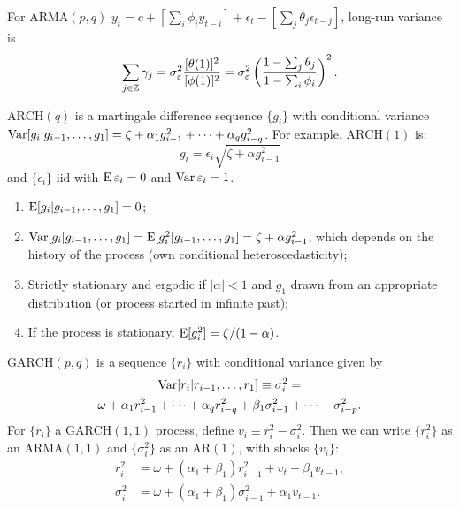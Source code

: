 \documentclass[8pt,letterpaper, landscape]{extarticle} %
\begin{document}
\begin{multicols}{3}
\begin{description}
For $ \text{ARMA} (p,q) $ $ y_t = c + [ \sum_i \phi_i y_{t-i} ] + \epsilon_t - [ \sum_j \theta_j \epsilon_{t-j}] $, long-run variance is
\[ \sum_{j \in \mathbb{Z}} \gamma_{j} = \sigma_{\varepsilon}^{2} \frac{[\theta(1)]^2}{[\phi(1)]^2} = \sigma_{\varepsilon}^{2} \left( \frac{1 - \sum_j \theta_j}{1 - \sum_i \phi_i} \right)^{2}. \]

 $ \text{ARCH} (q) $ is a martingale difference sequence $ \{ g_i \} $ with conditional variance $ \operatorname{Var} [g_i | g_{i-1}, \dotsc , g_{1}] = \zeta + \alpha_1 g_{i-1}^{2} + \dotsb + \alpha_q g_{i-q}^{2} $. For example, $ \text{ARCH} (1) $ is:
\[ g_i = \epsilon_i \sqrt{\zeta + \alpha g_{i-1}^{2}} \]
and $ \{ \epsilon_i \} $ iid with $ \operatorname{E} \varepsilon_i = 0 $ and $ \operatorname{Var} \varepsilon_i = 1 $.
\begin{enumerate}
\item $ \operatorname{E} [g_i | g_{i-1} , \dotsc , g_{1} ] = 0 $;
\item $ \operatorname{Var} [g_i | g_{i-1}, \dotsc , g_{1}] = \operatorname{E} [g_i^2 | g_{i-1} , \dotsc , g_{1}] = \zeta + \alpha g_{i-1}^{2} $, which depends on the history of the process (own conditional heteroscedasticity);
\item Strictly stationary and ergodic if $ | \alpha | < 1 $ and $ g_1 $ drawn from an appropriate distribution (or process started in infinite past);
\item If the process is stationary, $ \operatorname{E} [g_i^2] = \zeta / ( 1 - \alpha ) $.
\end{enumerate}

$ \text{GARCH} (p, q) $ is a sequence $ \{ r_i \} $ with conditional variance given by
\begin{multline*}
\operatorname{Var} [r_i | r_{i-1}, \dotsc , r_{1}] \equiv \sigma^{2}_{i} = \\
\omega + \alpha_1 r_{i-1}^{2} + \dotsb + \alpha_q r_{i-q}^{2} + \beta_1 \sigma^{2}_{i-1} + \dotsb + \sigma^{2}_{i-p} .
\end{multline*}
For $ \{ r_i \} $ a $ \text{GARCH} (1,1) $ process, define $ v_i \equiv r_{i}^{2} - \sigma_{i}^{2} $. Then we can write $ \{ r_{i}^{2} \} $ as an $ \text{ARMA} (1,1) $ and $ \{ \sigma_{i}^{2} \} $ as an $ \text{AR} (1) $, with shocks $ \{ v_{i} \} $:
\begin{align*}
r_{i}^{2} &= \omega + (\alpha_1 + \beta_1) r_{i-1}^{2} + v_t - \beta_1 v_{t-1} , \\
\sigma_{i}^{2} &= \omega + (\alpha_1 + \beta_1) \sigma_{i-1}^{2} + \alpha_1 v_{t-1} .
\end{align*}


\end{description}
\end{multicols}
\end{document}
